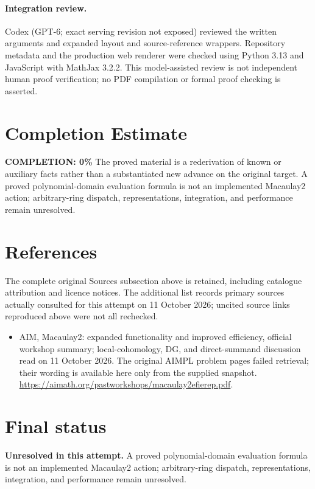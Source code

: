 \documentclass[11pt]{article}
\begin{document}
\paragraph{Integration review.} Codex (GPT-6; exact serving revision not exposed) reviewed the written arguments and expanded layout and source-reference wrappers. Repository metadata and the production web renderer were checked using Python 3.13 and JavaScript with MathJax 3.2.2. This model-assisted review is not independent human proof verification; no PDF compilation or formal proof checking is asserted.

\section{Completion Estimate}
\noindent\textbf{COMPLETION: 0\%}
The proved material is a rederivation of known or auxiliary facts rather than a substantiated new advance on the original target. A proved polynomial-domain evaluation formula is not an implemented Macaulay2 action; arbitrary-ring dispatch, representations, integration, and performance remain unresolved.
\section{References}
The complete original Sources subsection above is retained, including catalogue attribution and licence notices. The additional list records primary sources actually consulted for this attempt on 11 October 2026; uncited source links reproduced above were not all rechecked.
\begin{itemize}
\item AIM, Macaulay2: expanded functionality and improved efficiency, official workshop summary; local-cohomology, DG, and direct-summand discussion read on 11 October 2026. The original AIMPL problem pages failed retrieval; their wording is available here only from the supplied snapshot. \url{https://aimath.org/pastworkshops/macaulay2efierep.pdf}.
\end{itemize}
\section{Final status}
\textbf{Unresolved in this attempt.} A proved polynomial-domain evaluation formula is not an implemented Macaulay2 action; arbitrary-ring dispatch, representations, integration, and performance remain unresolved.
\end{document}
